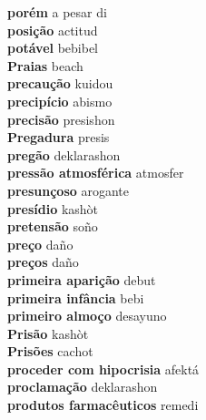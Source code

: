 \textbf{ porém  } a pesar di \\
\textbf{ posição  } actitud \\
\textbf{ potável  } bebibel \\
\textbf{ Praias  } beach \\
\textbf{ precaução  } kuidou \\
\textbf{ precipício  } abismo \\
\textbf{ precisão  } presishon \\
\textbf{ Pregadura  } presis \\
\textbf{ pregão  } deklarashon \\
\textbf{ pressão atmosférica  } atmosfer \\
\textbf{ presunçoso  } arogante \\
\textbf{ presídio  } kashòt \\
\textbf{ pretensão  } soño \\
\textbf{ preço  } daño \\
\textbf{ preços  } daño \\
\textbf{ primeira aparição  } debut \\
\textbf{ primeira infância  } bebi \\
\textbf{ primeiro almoço  } desayuno \\
\textbf{ Prisão  } kashòt \\
\textbf{ Prisões  } cachot \\
\textbf{ proceder com hipocrisia  } afektá \\
\textbf{ proclamação  } deklarashon \\
\textbf{ produtos farmacêuticos  } remedi \\
